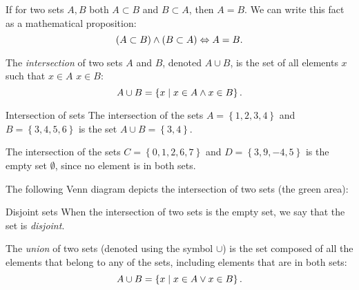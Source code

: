 If for two sets $A,B$ both $A\subset B$ and $B\subset A$, then $A=B$. We can write this fact as a mathematical proposition:
\begin{equation}
	(A\subset B) \wedge (B\subset A) \Leftrightarrow A=B.
	\label{eq:subset_equal}
\end{equation}

The \emph{intersection} of two sets $A$ and $B$, denoted $A\cup B$, is the set of all elements $x$ such that $x\in A$ \AND{} $x\in B$:
\begin{equation}
	A\cup B = \left\{ x \mid x\in A \wedge x\in B \right\}.
	\label{eq:intersection}
\end{equation}

\begin{example}{Intersection of sets}{}
	The intersection of the sets $A=\left\{ 1,2,3,4 \right\}$ and $B=\left\{ 3,4,5,6 \right\}$ is the set $A\cup B=\left\{ 3,4 \right\}$.

	The intersection of the sets $C=\left\{ 0,1,2,6,7 \right\}$ and $D=\left\{ 3,9,-4,5 \right\}$ is the empty set $\emptyset$, since no element is in both sets.
\end{example}
  
The following Venn diagram depicts the intersection of two sets (the green area):
\begin{figure}
	\centering
\end{figure}

\begin{note}{Disjoint sets}{}
	When the intersection of two sets is the empty set, we say that the set is \emph{disjoint}.
\end{note}

The \emph{union} of two sets (denoted using the symbol $\cup$) is the set composed of all the elements that belong to any of the sets, including elements that are in both sets:
\begin{equation}
	A\cup B = \left\{ x \mid x\in A \vee x\in B \right\}.
	\label{eq:union}
\end{equation}

